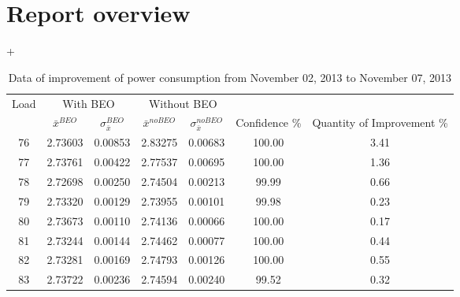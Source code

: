 \section{Report overview}
+\begin{table}[H]
\scriptsize
  \begin{center}
    \begin{tabular}{c c c c c c c}
    \toprule
    \multirow{2}{*}{Load} & \multicolumn{2}{c}{With BEO} & \multicolumn{2}{c}{Without BEO} & \\[0.2cm]
    \cmidrule{2-7}
     & $\bar{x}^{BEO}$ & $\sigma_{\bar{x}}^{BEO}$ & $\bar{x}^{noBEO}$ & $\sigma_{\bar{x}}^{noBEO}$ & Confidence \% & Quantity of Improvement \%\\
    \midrule
	76 & 2.73603 & 0.00853 & 2.83275 & 0.00683 & 100.00 & 3.41\\
    77 & 2.73761 & 0.00422 & 2.77537 & 0.00695 & 100.00 & 1.36\\
    78 & 2.72698 & 0.00250 & 2.74504 & 0.00213 & 99.99 & 0.66\\
    79 & 2.73320 & 0.00129 & 2.73955 & 0.00101 & 99.98 & 0.23\\
    80 & 2.73673 & 0.00110 & 2.74136 & 0.00066 & 100.00 & 0.17\\
    81 & 2.73244 & 0.00144 & 2.74462 & 0.00077 & 100.00 & 0.44\\
    82 & 2.73281 & 0.00169 & 2.74793 & 0.00126 & 100.00 & 0.55\\
    83 & 2.73722 & 0.00236 & 2.74594 & 0.00240 & 99.52 & 0.32\\
	\bottomrule
	\end{tabular}
    \caption{Data of improvement of power consumption from November 02, 2013 to November 07, 2013}
    \label{App:table02} 
  \end{center} 
\end{table}
